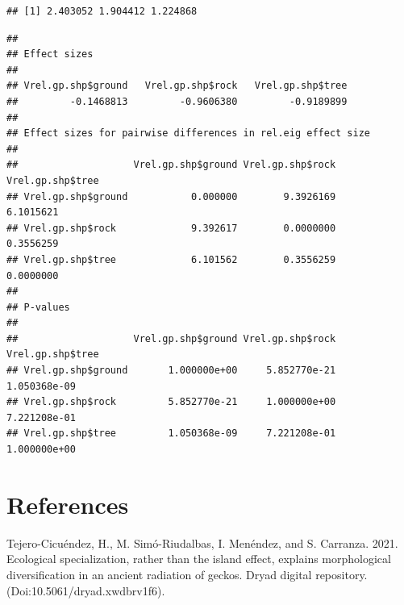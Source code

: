 \documentclass[
  11pt,
]{article}
\newenvironment{Shaded}{\begin{snugshade}}{\end{snugshade}}
\newcommand{\FunctionTok}[1]{\textcolor[rgb]{0.00,0.00,0.00}{#1}}
\newcommand{\NormalTok}[1]{#1}
\newcommand{\OtherTok}[1]{\textcolor[rgb]{0.56,0.35,0.01}{#1}}
\newcommand{\SpecialCharTok}[1]{\textcolor[rgb]{0.00,0.00,0.00}{#1}}
\newlength{\cslhangindent}
\newlength{\cslentryspacingunit} %
\newenvironment{CSLReferences}[2] %
 {%
  \setlength{\parindent}{0pt}
  \ifodd #1
  \let\oldpar\par
  \def\par{\hangindent=\cslhangindent\oldpar}
  \fi
  \setlength{\parskip}{#2\cslentryspacingunit}
 }%
 {}
\begin{document}
\begin{verbatim}
## [1] 2.403052 1.904412 1.224868
\end{verbatim}

\begin{Shaded}
\end{Shaded}

\begin{verbatim}
## 
## Effect sizes
## 
## Vrel.gp.shp$ground   Vrel.gp.shp$rock   Vrel.gp.shp$tree 
##         -0.1468813         -0.9606380         -0.9189899 
## 
## Effect sizes for pairwise differences in rel.eig effect size
## 
##                    Vrel.gp.shp$ground Vrel.gp.shp$rock Vrel.gp.shp$tree
## Vrel.gp.shp$ground           0.000000        9.3926169        6.1015621
## Vrel.gp.shp$rock             9.392617        0.0000000        0.3556259
## Vrel.gp.shp$tree             6.101562        0.3556259        0.0000000
## 
## P-values
## 
##                    Vrel.gp.shp$ground Vrel.gp.shp$rock Vrel.gp.shp$tree
## Vrel.gp.shp$ground       1.000000e+00     5.852770e-21     1.050368e-09
## Vrel.gp.shp$rock         5.852770e-21     1.000000e+00     7.221208e-01
## Vrel.gp.shp$tree         1.050368e-09     7.221208e-01     1.000000e+00
\end{verbatim}

\newpage

\hypertarget{references}{%
\section*{References}\label{references}}

\setlength{\parindent}{-0.25in} \setlength{\leftskip}{0.25in}
\setlength{\parskip}{8pt} \noindent

\hypertarget{refs}{}
\begin{CSLReferences}{1}{0}
\leavevmode{}%
Tejero-Cicuéndez, H., M. Simó-Riudalbas, I. Menéndez, and S. Carranza.
2021. Ecological specialization, rather than the island effect, explains
morphological diversification in an ancient radiation of geckos. Dryad
digital repository. (Doi:10.5061/dryad.xwdbrv1f6).

\end{CSLReferences}

\newpage
\end{document}
